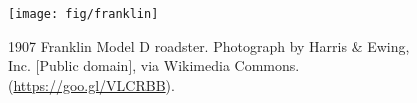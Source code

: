 \begin{figure}[h]
  \centering
  \texttt{[image: fig/franklin]}
  \caption{1907 Franklin Model D roadster. Photograph by Harris \& Ewing, Inc. [Public domain], via Wikimedia Commons. (\url{https://goo.gl/VLCRBB}).}
\end{figure}